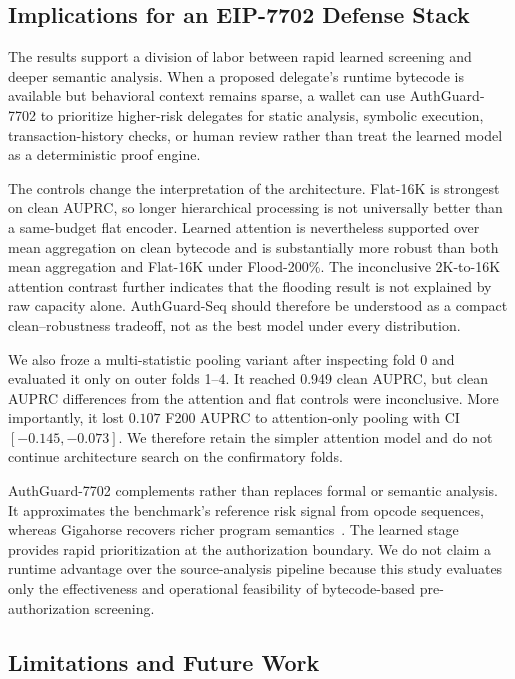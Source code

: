 \documentclass[conference]{IEEEtran}
\begin{document}
\subsection{Implications for an EIP-7702 Defense Stack}

The results support a division of labor between rapid learned screening and deeper semantic analysis. When a proposed delegate's runtime bytecode is available but behavioral context remains sparse, a wallet can use AuthGuard-7702 to prioritize higher-risk delegates for static analysis, symbolic execution, transaction-history checks, or human review rather than treat the learned model as a deterministic proof engine.

The controls change the interpretation of the architecture. Flat-16K is strongest on clean AUPRC, so longer hierarchical processing is not universally better than a same-budget flat encoder. Learned attention is nevertheless supported over mean aggregation on clean bytecode and is substantially more robust than both mean aggregation and Flat-16K under Flood-200\%. The inconclusive 2K-to-16K attention contrast further indicates that the flooding result is not explained by raw capacity alone. AuthGuard-Seq should therefore be understood as a compact clean--robustness tradeoff, not as the best model under every distribution.

We also froze a multi-statistic pooling variant after inspecting fold 0 and evaluated it only on outer folds 1--4. It reached 0.949 clean AUPRC, but clean AUPRC differences from the attention and flat controls were inconclusive. More importantly, it lost $0.107$ F200 AUPRC to attention-only pooling with CI $[-0.145,-0.073]$. We therefore retain the simpler attention model and do not continue architecture search on the confirmatory folds.

AuthGuard-7702 complements rather than replaces formal or semantic analysis. It approximates the benchmark's reference risk signal from opcode sequences, whereas Gigahorse recovers richer program semantics~\cite{gigahorse2019}. The learned stage provides rapid prioritization at the authorization boundary. We do not claim a runtime advantage over the source-analysis pipeline because this study evaluates only the effectiveness and operational feasibility of bytecode-based pre-authorization screening.

\subsection{Limitations and Future Work}
\end{document}
